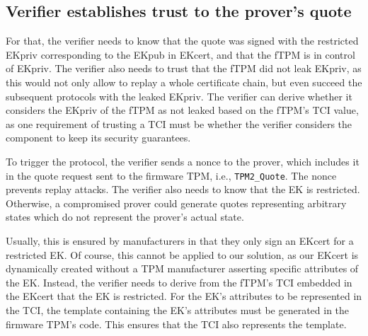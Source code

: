 \subsection{Verifier establishes trust to the prover's quote}\label{subsec:trust_quote_from_prover}

For that, the verifier needs to know that the quote was signed with the restricted EKpriv corresponding to the EKpub in EKcert, and that the fTPM is in control of EKpriv.
The verifier also needs to trust that the fTPM did not leak EKpriv, as this would not only allow to replay a whole certificate chain, but even succeed the subsequent protocols with the leaked EKpriv.
The verifier can derive whether it considers the EKpriv of the fTPM as not leaked based on the fTPM's TCI value, as one requirement of trusting a TCI must be whether the verifier considers the component to keep its security guarantees.

To trigger the protocol, the verifier sends a nonce to the prover, which includes it in the quote request sent to the firmware TPM, i.e., \texttt{TPM2\_Quote}.
The nonce prevents replay attacks.
The verifier also needs to know that the EK is restricted.
Otherwise, a compromised prover could generate quotes representing arbitrary states which do not represent the prover's actual state.

Usually, this is ensured by manufacturers in that they only sign an EKcert for a restricted EK\@.
Of course, this cannot be applied to our solution, as our EKcert is dynamically created without a TPM manufacturer asserting specific attributes of the EK\@.
Instead, the verifier needs to derive from the fTPM's TCI embedded in the EKcert that the EK is restricted.
For the EK's attributes to be represented in the TCI, the template containing the EK's attributes must be generated in the firmware TPM's code.
This ensures that the TCI also represents the template.


